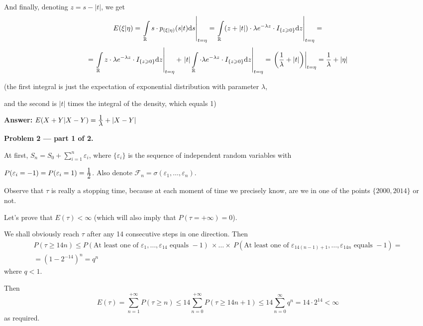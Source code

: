 \documentclass[pdftex,12pt,a4paper]{article}
\renewcommand{\FF}{\mathcal{F}}
\renewcommand{\ee}{\varepsilon}
\begin{document}
And finally, denoting $z = s - |t|$, we get
$$
E(\xi|\eta) = \left.\int\limits_{\mathbb R}s\cdot p_{(\xi|\eta)}(s|t)\mathrm{d}s\right|_{t = \eta} = \left.\int\limits_{\mathbb R}(z + |t|)\cdot\lambda e^{-\lambda z}\cdot I_{\{z\geqslant 0\}}\mathrm{d}z\right|_{t = \eta}  = $$  $$= \left.\int\limits_{\mathbb R}z\cdot\lambda e^{-\lambda z}\cdot I_{\{z\geqslant 0\}}\mathrm{d}z\right|_{t = \eta} + \left.|t|\int\limits_{\mathbb R}\cdot\lambda e^{-\lambda z}\cdot I_{\{z\geqslant 0\}}\mathrm{d}z\right|_{t = \eta} =  \left.\left(\frac{\displaystyle 1}{\displaystyle \lambda} + |t|\right)\right|_{t = \eta} = \frac{\displaystyle 1}{\displaystyle \lambda} + |\eta|
$$\par
(the first integral is just the expectation of exponential distribution with parameter $\lambda$,\par and the second is $|t|$ times the integral of the density, which equals 1)\[\]\par
\textbf{Answer:} $E(X+Y| X-Y) = \frac{\displaystyle 1}{\displaystyle \lambda} + |X-Y|$








\textbf{Problem 2 --- part 1 of 2.}\par
At first, $S_{n} = S_{0}+\sum\limits_{i = 1}^{n}\ee_{i}$, where $\{\ee_{i}\}$ is the sequence of independent random variables with\par
 $P(\ee_{i} = -1) = P(\ee_{i} = 1) = \frac{\ds 1}{\ds 2}$. Also denote $\FF_{n} = \sigma(\ee_{1},\ldots,\ee_{n})$.\par
Observe that $\tau$ is really a stopping time, because at each moment of time we precisely know, are we in one of the points $\{2000, 2014\}$ or not.\par

Let's prove that $E(\tau) < \infty$ (which will also imply that $P(\tau = +\infty) = 0$).\par
We shall obviously reach $\tau$ after any 14 consecutive steps in one direction.
Then 
\begin{multline}
P(\tau \geqslant 14n)\leqslant P(\mbox{At least one of }\ee_{1},\ldots ,\ee_{14}\mbox{ equals } -1)\ \times \ldots \times\  P(\mbox{At least one of }\ee_{14(n-1)+1},\ldots ,\ee_{14n}\mbox{ equals } -1) = \\
= \left(1 - 2^{-14}\right)^{n} = q^{n}
\end{multline}
where $q<1$.

Then
\[
E(\tau) = \sum\limits_{n = 1}^{+\infty}P(\tau \geqslant n) \leqslant 14\sum\limits_{n = 0}^{+\infty}P(\tau \geqslant 14n+1)\leqslant 14\sum\limits_{n = 0}^{\infty}q^{n} = 14\cdot 2^{14} < \infty
\]
as required.
\end{document}
